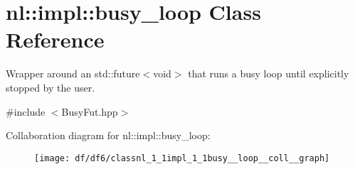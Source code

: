 \hypertarget{classnl_1_1impl_1_1busy__loop}{}\section{nl\+:\+:impl\+:\+:busy\+\_\+loop Class Reference}
\label{classnl_1_1impl_1_1busy__loop}


Wrapper around an {\ttfamily std\+::future$<$void$>$} that runs a busy loop until explicitly stopped by the user.  




{\ttfamily \#include $<$Busy\+Fut.\+hpp$>$}



Collaboration diagram for nl\+:\+:impl\+:\+:busy\+\_\+loop\+:\nopagebreak
\begin{figure}[H]
\begin{center}
\leavevmode
\texttt{[image: df/df6/classnl\_1\_1impl\_1\_1busy\_\_loop\_\_coll\_\_graph]}
\end{center}
\end{figure}
